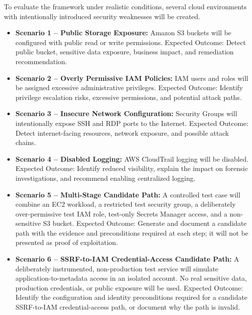 To evaluate the framework under realistic conditions, several cloud environments with intentionally introduced security weaknesses will be created.

\begin{itemize}
\tightlist
\item
  \textbf{Scenario 1 -- Public Storage Exposure:} Amazon S3 buckets will be configured with public read or write permissions. Expected Outcome: Detect public bucket, sensitive data exposure, business impact, and remediation recommendation.\\
\item
  \textbf{Scenario 2 -- Overly Permissive IAM Policies:} IAM users and roles will be assigned excessive administrative privileges. Expected Outcome: Identify privilege escalation risks, excessive permissions, and potential attack paths.\\
\item
  \textbf{Scenario 3 -- Insecure Network Configuration:} Security Groups will intentionally expose SSH and RDP ports to the Internet. Expected Outcome: Detect internet-facing resources, network exposure, and possible attack chains.\\
\item
  \textbf{Scenario 4 -- Disabled Logging:} AWS CloudTrail logging will be disabled. Expected Outcome: Identify reduced visibility, explain the impact on forensic investigations, and recommend enabling centralized logging.\\
\item
  \textbf{Scenario 5 -- Multi-Stage Candidate Path:} A controlled test case will combine an EC2 workload, a restricted test security group, a deliberately over-permissive test IAM role, test-only Secrets Manager access, and a non-sensitive S3 bucket. Expected Outcome: Generate and document a candidate path with the evidence and preconditions required at each step; it will not be presented as proof of exploitation.\\
\item
  \textbf{Scenario 6 -- SSRF-to-IAM Credential-Access Candidate Path:} A deliberately instrumented, non-production test service will simulate application-to-metadata access in an isolated account. No real sensitive data, production credentials, or public exposure will be used. Expected Outcome: Identify the configuration and identity preconditions required for a candidate SSRF-to-IAM credential-access path, or document why the path is invalid.
\end{itemize}

